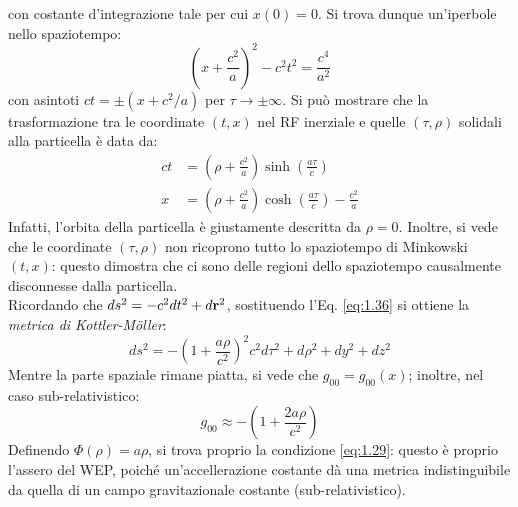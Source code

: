 con costante d'integrazione tale per cui $ x(0) = 0 $. Si trova dunque un'iperbole nello spaziotempo:
\begin{equation}
  \left( x + \frac{c^2}{a} \right)^2 - c^2 t^2 = \frac{c^4}{a^2}
  \label{eq:1.35}
\end{equation}
con asintoti $ ct = \pm \left( x + c^2 / a \right) $ per $ \tau \rightarrow \pm\infty $. Si può mostrare che la trasformazione tra le coordinate $ (t,x) $ nel RF inerziale e quelle $ (\tau,\rho) $ solidali alla particella è data da:
\begin{equation}
  \begin{split}
    ct &= \left( \rho + \frac{c^2}{a} \right) \sinh \left( \frac{a\tau}{c} \right) \\
    x &= \left( \rho + \frac{c^2}{a} \right) \cosh \left( \frac{a\tau}{c} \right) - \frac{c^2}{a}
  \end{split}
  \label{eq:1.36}
\end{equation}
Infatti, l'orbita della particella è giustamente descritta da $ \rho = 0 $. Inoltre, si vede che le coordinate $ (\tau,\rho) $ non ricoprono tutto lo spaziotempo di Minkowski $ (t,x) $: questo dimostra che ci sono delle regioni dello spaziotempo causalmente disconnesse dalla particella.\\
Ricordando che $ ds^2 = -c^2 dt^2 + d\mathbf{r}^2 $, sostituendo l'Eq. \ref{eq:1.36} si ottiene la \textit{metrica di Kottler-Möller}:
\begin{equation}
  ds^2 = - \left( 1 + \frac{a\rho}{c^2} \right)^2 c^2 d\tau^2 + d\rho^2 + dy^2 + dz^2
  \label{eq:1.37}
\end{equation}
Mentre la parte spaziale rimane piatta, si vede che $ g_{00} = g_{00} (x) $; inoltre, nel caso sub-relativistico:
\begin{equation}
  g_{00} \approx - \left( 1 + \frac{2a\rho}{c^2} \right)
  \label{eq:1.38}
\end{equation}
Definendo $ \Phi(\rho) = a\rho $, si trova proprio la condizione \ref{eq:1.29}: questo è proprio l'assero del WEP, poiché un'accellerazione costante dà una metrica indistinguibile da quella di un campo gravitazionale costante (sub-relativistico).










